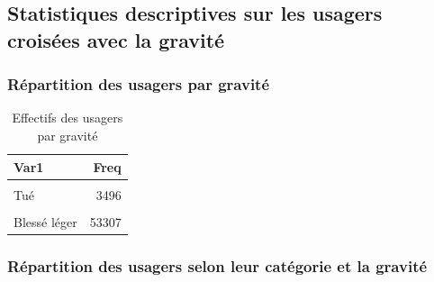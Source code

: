 \documentclass[french,]{tp}
\begin{document}
\hypertarget{statistiques-descriptives-sur-les-usagers-croisuxe9es-avec-la-gravituxe9}{%
\subsection{Statistiques descriptives sur les usagers croisées avec la gravité}\label{statistiques-descriptives-sur-les-usagers-croisuxe9es-avec-la-gravituxe9}}

\hypertarget{ruxe9partition-des-usagers-par-gravituxe9}{%
\subsubsection{Répartition des usagers par gravité}\label{ruxe9partition-des-usagers-par-gravituxe9}}



\begin{table}[H]

\caption{\label{tab:tableex}Effectifs des usagers par gravité}
\centering
\begin{tabular}[t]{lr}
\toprule
\textbf{Var1} & \textbf{Freq}\\
\midrule
\cellcolor{gray!6}{Indemne} & \cellcolor{gray!6}{55314}\\
Tué & 3496\\
\cellcolor{gray!6}{Blessé hospitalisé} & \cellcolor{gray!6}{20858}\\
Blessé léger & 53307\\
\bottomrule
\end{tabular}
\end{table}

\hypertarget{ruxe9partition-des-usagers-selon-leur-catuxe9gorie-et-la-gravituxe9}{%
\subsubsection{Répartition des usagers selon leur catégorie et la gravité}\label{ruxe9partition-des-usagers-selon-leur-catuxe9gorie-et-la-gravituxe9}}
\end{document}
